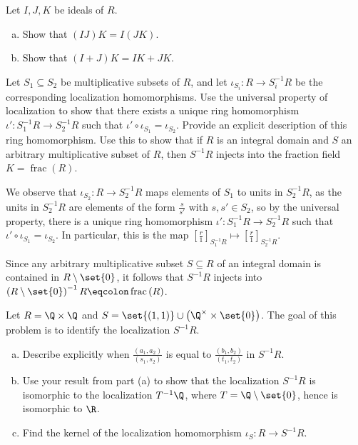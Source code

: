 \documentclass[10pt]{mypackage}
\begin{document}
\RaggedRight
\begin{problem}[Problem 1]
  Let $I,J,K$ be ideals of $R$.
  \begin{enumerate}[(a)]
    \item Show that $\left( IJ \right)K = I\left( JK \right)$.
    \item Show that $\left( I + J \right)K = IK + JK$.
  \end{enumerate}
\end{problem}

\begin{problem}[Problem 4]
  Let $S_1\subseteq S_2$ be multiplicative subsets of $R$, and let $\iota_{S_i}\colon R\rightarrow S_i^{-1}R$ be the corresponding localization homomorphisms. Use the universal property of localization to show that there exists a unique ring homomorphism $\iota'\colon S_1^{-1}R\rightarrow S_2^{-1}R$ such that $\iota'\circ \iota_{S_1} = \iota_{S_2}$. Provide an explicit description of this ring homomorphism. Use this to show that if $R$ is an integral domain and $S$ an arbitrary multiplicative subset of $R$, then $S^{-1}R$ injects into the fraction field $K = \operatorname{frac}\left( R \right)$.
\end{problem}
\begin{solution}
  We observe that $\iota_{S_2}\colon R\rightarrow S_{2}^{-1}R$ maps elements of $S_1$ to units in $S_2^{-1}R$, as the units in $S_2^{-1}R$ are elements of the form $ \frac{s}{s'} $ with $s,s'\in S_2$, so by the universal property, there is a unique ring homomorphism $\iota'\colon S_1^{-1}R\rightarrow S_2^{-1}R$ such that $\iota'\circ \iota_{S_1} = \iota_{S_2}$. In particular, this is the map $ \left[ \frac{r}{1} \right]_{S_1^{-1}R} \mapsto \left[ \frac{r}{1} \right]_{S_2^{-1}R} $.\newline

  Since any arbitrary multiplicative subset $S\subseteq R$ of an integral domain is contained in $R\setminus \set{0}$, it follows that $S^{-1}R$ injects into $ \left( R\setminus \set{0} \right)^{-1}R \eqcolon \operatorname{frac}\left( R \right) $.
\end{solution}
\begin{problem}[Problem 5]
  Let $R = \Q\times \Q$ and $S = \set{\left( 1,1 \right)}\cup \left( \Q^{\times}\times \set{0} \right)$. The goal of this problem is to identify the localization $S^{-1}R$.
  \begin{enumerate}[(a)]
    \item Describe explicitly when $\frac{\left( a_1,a_2 \right)}{\left( s_1,s_2 \right)}$ is equal to $\frac{\left( b_1,b_2 \right)}{\left( t_1,t_2 \right)}$ in $S^{-1}R$.
    \item Use your result from part (a) to show that the localization $S^{-1}R$ is isomorphic to the localization $T^{-1}\Q$, where $T = \Q\setminus \set{0}$, hence is isomorphic to $\R$.
    \item Find the kernel of the localization homomorphism $\iota_S\colon R\rightarrow S^{-1}R$.
  \end{enumerate}
\end{problem}
\end{document}
